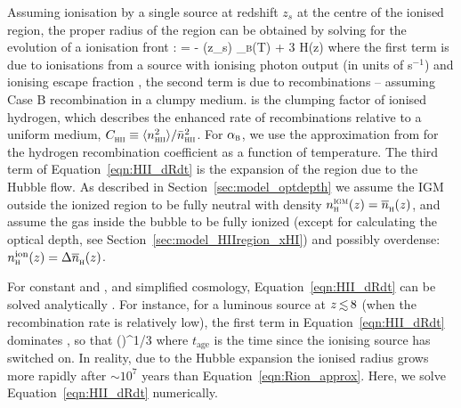 \documentclass[fleqn,usenatbib]{mnras}
\begin{document}
Assuming ionisation by a single source at redshift $z_s$ at the centre of the ionised region, the proper radius of the region can be obtained by solving for the evolution of a ionisation front \citep[e.g,][]{Shapiro1987,Cen2000,Yajima2018}:
%
\BE \label{eqn:HII_dRdt}
 =  - \clump \Delta \nh(z_s) \alpha_\textsc{b}(T) \Rion[3] + 3 H(z) \Rion[3]
\EE
%
where the first term is due to ionisations from a source with ionising photon output \Nion (in units of s$^{-1}$) and ionising escape fraction \fesc, the second term is due to recombinations -- assuming Case B recombination in a clumpy medium. \clump is the clumping factor of ionised hydrogen, which describes the enhanced rate of recombinations relative to a uniform medium, $\clump \equiv \langle n_\HII^2\rangle / \bar n_\HII^2$. For $\alpha_\textsc{b}$, we use the approximation from \citet{Hui1997} for the hydrogen recombination coefficient as a function of temperature. The third term of Equation~\eqref{eqn:HII_dRdt} is the expansion of the region due to the Hubble flow. As described in Section~\ref{sec:model_optdepth} we assume the IGM outside the ionized region to be fully neutral with density $n_\textsc{h}^\textsc{igm}(z) = \nh(z)$, and assume the gas inside the bubble to be fully ionized (except for calculating the optical depth, see Section~\ref{sec:model_HIIregion_xHI}) and possibly overdense: $n_\textsc{h}^\mathrm{ion}(z) = \Delta \nh(z)$.

For constant \Nion and \fesc, and simplified cosmology, Equation~\eqref{eqn:HII_dRdt} can be solved analytically \citep{Shapiro1987}. For instance, for a luminous source at $z\simlt8$ (when the recombination rate is relatively low), the first term in Equation~\eqref{eqn:HII_dRdt} dominates \citep[Equation 2 of][]{Cen2000}, so that
%
\BE \label{eqn:Rion_approx}
\Rion \approx \left(\right)^{1/3}
\EE
%
where $t_\mathrm{age}$ is the time since the ionising source has switched on. In reality, due to the Hubble expansion the ionised radius grows more rapidly after $\sim10^7$ years than Equation~\eqref{eqn:Rion_approx}. Here, we solve Equation~\eqref{eqn:HII_dRdt} numerically. 
\end{document}
